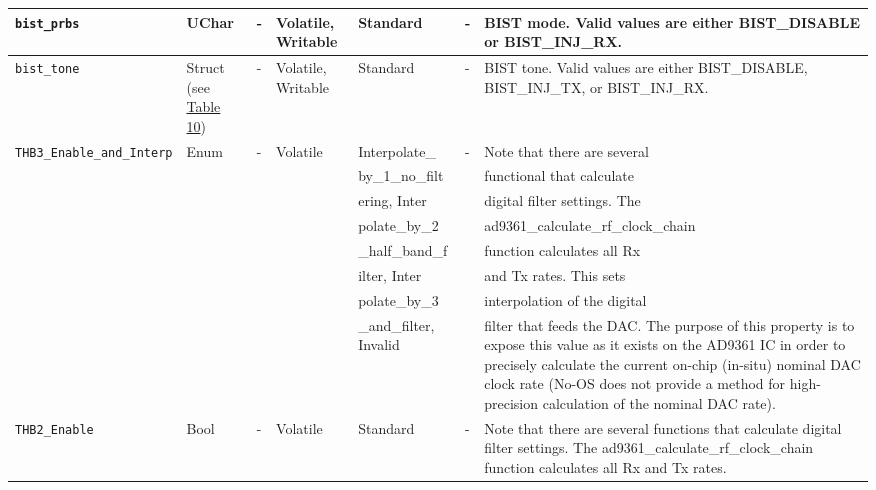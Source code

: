 \documentclass{article}
\begin{document}
\begin{landscape}
\begin{scriptsize}
\begin{longtable}{|p{3.6cm}|p{8.1cm}|p{1.4cm}|p{1.3cm}|p{1.4cm}|p{2.5cm}|p{3.6cm}|}
			\hline
			\verb+bist_prbs+ & UChar & - & Volatile, Writable & Standard & - & BIST mode. Valid values are either BIST\_DISABLE or BIST\_INJ\_RX. \\
			\hline
			\verb+bist_tone+ & Struct (see \hyperlink{tab10}{Table 10}) & - & Volatile, Writable & Standard & - & BIST tone. Valid values are either BIST\_DISABLE, BIST\_INJ\_TX, or BIST\_INJ\_RX. \\
			\hline
			\verb+THB3_Enable_and_Interp+ & Enum & - & Volatile & Interpolate\_ & - &  Note that there are several \\
			                              &      &   &          & by\_1\_no\_filt        &   & functional that calculate \\
			                              &      &   &          & ering, Inter           &   & digital filter settings. The \\
			                              &      &   &          & polate\_by\_2          &   &  ad9361\_calculate\_rf\_clock\_chain \\
			                              &      &   &          & \_half\_band\_f        &   &  function calculates all Rx \\
			                              &      &   &          & ilter, Inter           &   &  and Tx rates. This sets \\
			                              &      &   &          & polate\_by\_3          &   &  interpolation of the digital\\
			                              &      &   &          & \_and\_filter, Invalid &   &  filter that feeds the
                                            DAC. The purpose of this property is
                                            to expose this value as it exists on
                                            the AD9361 IC in order to precisely
                                            calculate the current on-chip
                                            (in-situ) nominal DAC clock rate
                                            (No-OS does not provide a method for
                                            high-precision calculation of the
                                            nominal DAC rate). \\
			\hline
			\verb+THB2_Enable+ & Bool & - & Volatile & Standard & - & 
                               Note that there are several
                                 functions that calculate digital filter
                                 settings. The ad9361\_calculate\_rf\_clock\_chain
                                 function calculates all Rx and Tx rates.

\end{longtable}
\end{scriptsize}
\end{landscape}
\end{document}
